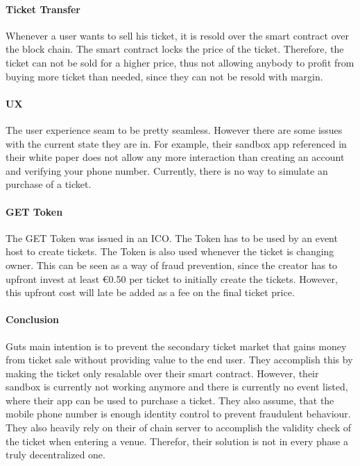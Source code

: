 \paragraph{Ticket Transfer}
Whenever a user wants to sell his ticket, it is resold over the smart contract over the block chain. The smart contract locks the price of the ticket. Therefore, the ticket can not be sold for a higher price, thus not allowing anybody to profit from buying more ticket than needed, since they can not be resold with margin. 


\paragraph{UX}
The user experience seam to be pretty seamless. However there are some issues with the current state they are in. For example, their sandbox app referenced in their white paper does not allow any more interaction than creating an account and verifying your phone number. Currently, there is no way to simulate an purchase of a ticket.  


\paragraph{GET Token}
The GET Token was issued in an ICO. The Token has to be used by an event host to create tickets. The Token is also used whenever the ticket is changing owner. This can be seen as a way of fraud prevention, since the creator has to upfront invest at least \euro0.50 per ticket to initially create the tickets. However, this upfront cost will late be added as a fee on the final ticket price.


\paragraph{Conclusion}
Guts main intention is to prevent the secondary ticket market that gains money from ticket sale without providing value to the  end user. They accomplish this by making the ticket only resalable over their smart contract. However, their sandbox is currently not working anymore and there is currently no event listed, where their app can be used to purchase a ticket. They also assume, that the mobile phone number is enough identity control to prevent fraudulent behaviour. They also heavily rely on their of chain server to accomplish the validity check of the ticket when entering a venue. Therefor, their solution is not in every phase a truly decentralized one.  